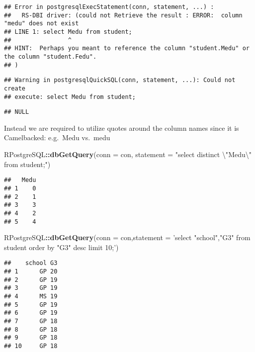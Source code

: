 \documentclass[]{book}
\newenvironment{Shaded}{\begin{snugshade}}{\end{snugshade}}
\newcommand{\KeywordTok}[1]{\textcolor[rgb]{0.13,0.29,0.53}{\textbf{#1}}}
\newcommand{\DataTypeTok}[1]{\textcolor[rgb]{0.13,0.29,0.53}{#1}}
\newcommand{\CharTok}[1]{\textcolor[rgb]{0.31,0.60,0.02}{#1}}
\newcommand{\StringTok}[1]{\textcolor[rgb]{0.31,0.60,0.02}{#1}}
\newcommand{\OperatorTok}[1]{\textcolor[rgb]{0.81,0.36,0.00}{\textbf{#1}}}
\newcommand{\NormalTok}[1]{#1}
\begin{document}
\begin{verbatim}
## Error in postgresqlExecStatement(conn, statement, ...) : 
##   RS-DBI driver: (could not Retrieve the result : ERROR:  column "medu" does not exist
## LINE 1: select Medu from student;
##                ^
## HINT:  Perhaps you meant to reference the column "student.Medu" or the column "student.Fedu".
## )
\end{verbatim}

\begin{verbatim}
## Warning in postgresqlQuickSQL(conn, statement, ...): Could not create
## execute: select Medu from student;
\end{verbatim}

\begin{verbatim}
## NULL
\end{verbatim}

Instead we are required to utilize quotes around the column names since
it is Camelbacked: e.g.~Medu vs.~medu

\begin{Shaded}
\begin{Highlighting}[]
\NormalTok{RPostgreSQL}\OperatorTok{::}\KeywordTok{dbGetQuery}\NormalTok{(}\DataTypeTok{conn =}\NormalTok{ con, }\DataTypeTok{statement =} \StringTok{"select distinct }\CharTok{\textbackslash{}"}\StringTok{Medu}\CharTok{\textbackslash{}"}\StringTok{ from student;"}\NormalTok{)}
\end{Highlighting}
\end{Shaded}

\begin{verbatim}
##   Medu
## 1    0
## 2    1
## 3    3
## 4    2
## 5    4
\end{verbatim}

\begin{Shaded}
\begin{Highlighting}[]
\NormalTok{RPostgreSQL}\OperatorTok{::}\KeywordTok{dbGetQuery}\NormalTok{(}\DataTypeTok{conn =}\NormalTok{ con,}\DataTypeTok{statement =} \StringTok{'select "school","G3" from student order by "G3" desc limit 10;'}\NormalTok{)}
\end{Highlighting}
\end{Shaded}

\begin{verbatim}
##    school G3
## 1      GP 20
## 2      GP 19
## 3      GP 19
## 4      MS 19
## 5      GP 19
## 6      GP 19
## 7      GP 18
## 8      GP 18
## 9      GP 18
## 10     GP 18
\end{verbatim}
\end{document}
